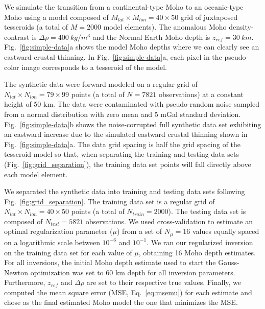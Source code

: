 \documentclass[extra,mreferee]{gji}
\begin{document}
We simulate the transition from a continental-type Moho to an oceanic-type Moho
using a model composed of $M_{lat} \times M_{lon} = 40 \times 50$ grid of
juxtaposed tesseroids (a total of $M = 2000$ model elements).
The anomalous Moho density-contrast is $\Delta\rho = 400\ kg/m^3$
and the Normal Earth Moho depth is $z_{ref} = 30\ km$.
Fig.~\ref{fig:simple-data}a shows the model Moho depths where we can clearly
see an eastward crustal thinning.
In Fig.~\ref{fig:simple-data}a, each pixel in the pseudo-color image
corresponds to a tesseroid of the model.

The synthetic data were forward modeled on a regular grid of
$N_{lat} \times N_{lon} = 79 \times 99$ points
(a total of $N = 7821$ observations)
at a constant height of 50 km.
The data were contaminated with pseudo-random noise
sampled from a normal distribution with zero mean and 5 mGal standard deviation.
Fig.~\ref{fig:simple-data}b shows the noise-corrupted full synthetic data set
exhibiting an eastward increase due to the simulated eastward
crustal thinning shown in Fig.~\ref{fig:simple-data}a.
The data grid spacing is half the grid spacing of the tesseroid model
so that, when separating the training and testing data sets
(Fig.~\ref{fig:grid_separation}),
the training data set points will fall directly above each model element.

We separated the synthetic data into training and testing data sets
following Fig.~\ref{fig:grid_separation}.
The training data set is a regular grid of
$N_{lat} \times N_{lon} = 40 \times 50$ points
(a total of $N_{train} = 2000$).
The testing data set is composed of $N_{test} = 5821$ observations.
We used cross-validation to estimate an optimal regularization parameter ($\mu$)
from a set of $N_\mu = 16$ values equally spaced on a logarithmic scale
between $10^{-6}$ and $10^{-1}$.
We ran our regularized inversion on the training data set
for each value of $\mu$,
obtaining 16 Moho depth estimates.
For all inversions, the initial Moho depth estimate
used to start the Gauss-Newton optimization
was set to 60 km depth for all inversion parameters.
Furthermore, $z_{ref}$ and $\Delta\rho$ are set to their respective true values.
Finally, we computed the mean square error (MSE, Eq.~\ref{eq:msemu})
for each estimate and chose as the final estimated Moho model
the one that minimizes the MSE.
\end{document}
